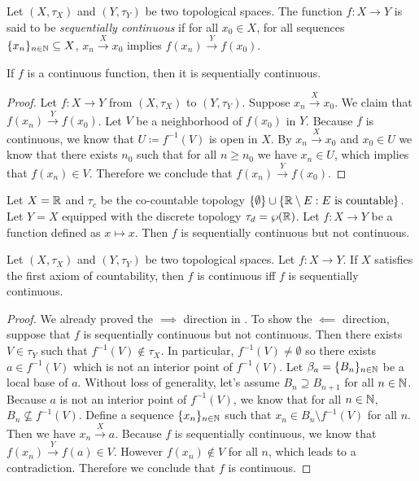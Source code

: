 \documentclass[screen]{techreport}
\numberwithin{equation}{section}
\begin{document}
\begin{definition}\label{De:SequentiallyContinuous}
	Let $(X,\tau_X)$ and $(Y,\tau_Y)$ be two topological spaces.
	The function $f : X \to Y$ is said to be \emph{sequentially continuous} if for all $x_0 \in X$, for all sequences $\{x_n\}_{n \in \mathbb{N}} \subseteq X$, $x_n \xrightarrow{X} x_0$ implies $f(x_n) \xrightarrow{Y} f(x_0)$.
\end{definition}

\begin{proposition}\label{Prop:ContImplySeqCont}
	If $f$ is a continuous function, then it is sequentially continuous.
\end{proposition}
\begin{proof}
	Let $f : X \to Y$ from $(X,\tau_X)$ to $(Y,\tau_Y)$.
	Suppose $x_n \xrightarrow{X} x_0$.
	We claim that $f(x_n) \xrightarrow{Y} f(x_0)$.
	Let $V$ be a neighborhood of $f(x_0)$ in $Y$.
	Because $f$ is continuous, we know that $U \coloneqq f^{-1}(V)$ is open in $X$.
	By $x_n \xrightarrow{X} x_0$ and $x_0 \in U$ we know that there exists $n_0$ such that for all $n \ge n_0$ we have $x_n \in U$, which implies that $f(x_n) \in V$.
	Therefore we conclude that $f(x_n) \xrightarrow{Y} f(x_0)$.
\end{proof}

\begin{example}\label{Exa:SeqContNotCont}
	Let $X = \mathbb{R}$ and $\tau_c$ be the co-countable topology $\{ \emptyset \} \cup \{ \mathbb{R} \setminus E : E~\text{is countable} \}$.
	Let $Y = X$ equipped with the discrete topology $\tau_d = \wp(\mathbb{R})$.
	Let $f : X \to Y$ be a function defined as $x \mapsto x$.
	Then $f$ is sequentially continuous but not continuous.
\end{example}

\begin{proposition}\label{Prop:FstAxCountContIffSeqCont}
	Let $(X,\tau_X)$ and $(Y,\tau_Y)$ be two topological spaces.
	Let $f : X\to Y$.
	If $X$ satisfies the first axiom of countability, then $f$ is continuous iff $f$ is sequentially continuous.
\end{proposition}
\begin{proof}
	We already proved the ${\implies}$ direction in .
	To show the ${\impliedby}$ direction, suppose that $f$ is sequentially continuous but not continuous.
	Then there exists $V \in \tau_Y$ such that $f^{-1}(V) \not\in \tau_X$.
	In particular, $f^{-1}(V) \neq \emptyset$ so there exists $a \in f^{-1}(V)$ which is not an interior point of $f^{-1}(V)$.
	Let $\beta_a = \{B_n\}_{n\in \mathbb{N}}$ be a local base of $a$.
	Without loss of generality, let's assume $B_n \supseteq B_{n+1}$ for all $n \in \mathbb{N}$.
	Because $a$ is not an interior point of $f^{-1}(V)$, we know that for all $n \in \mathbb{N}$, $B_n \not\subseteq f^{-1}(V)$.
	Define a sequence $\{x_n\}_{n \in \mathbb{N}}$ such that $x_n \in B_n \setminus f^{-1}(V)$ for all $n$.
	Then we have $x_n \xrightarrow{X} a$.
	Because $f$ is sequentially continuous, we know that $f(x_n) \xrightarrow{Y} f(a) \in V$.
	However $f(x_n) \not\in V$ for all $n$, which leads to a contradiction.
	Therefore we conclude that $f$ is continuous.
\end{proof}
\end{document}
